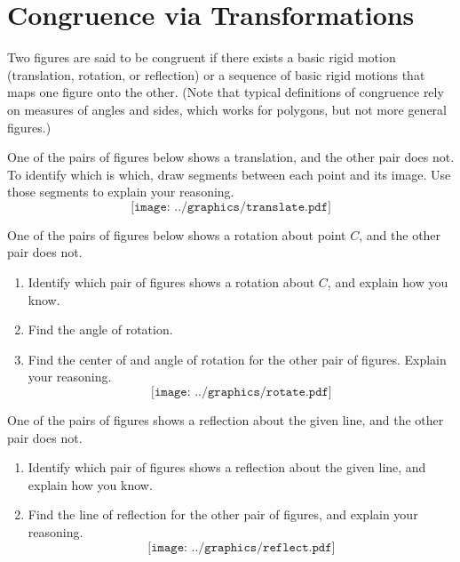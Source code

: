\newpage

\section{Congruence via Transformations}
Two figures are said to be congruent if there exists a basic rigid motion (translation, 
rotation, or reflection) or a sequence of basic rigid motions that maps one figure onto 
the other.  (Note that typical definitions of congruence rely on measures of 
angles and sides, which works for polygons, but not more general figures.)  

\begin{prob}
One of the pairs of figures below shows a translation, and the other pair does not.  To identify which is which, draw segments between each point and its image.  Use those segments to explain your reasoning.
$$\texttt{[image: ../graphics/translate.pdf]}$$
\end{prob}

\newpage

\begin{prob}
One of the pairs of figures below shows a rotation about point $C$, and the other pair does not. 
\begin{enumerate}
\item Identify which pair of figures shows a rotation about $C$, and explain how you know.  
\item Find the angle of rotation.  
\item Find the center of and angle of rotation for the other pair of figures.  Explain your reasoning.  
$$\texttt{[image: ../graphics/rotate.pdf]}$$
\end{enumerate}
\end{prob}

\newpage
\begin{prob}
One of the pairs of figures shows a reflection about the given line, and the other pair does not.  
\begin{enumerate}
\item Identify which pair of figures shows a reflection about the given line, and explain how you know. 
\item Find the line of reflection for the other pair of figures, and explain your reasoning.  
$$\texttt{[image: ../graphics/reflect.pdf]}$$
\end{enumerate}
\end{prob}


